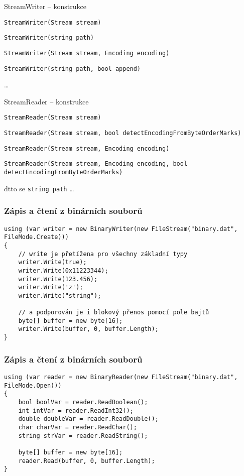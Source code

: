 \begin{frame}[fragile]
\vfill
\begin{bitemize}{StreamWriter -- konstrukce}
\item \lstinline|StreamWriter(Stream stream)|
\item \lstinline|StreamWriter(string path)|
\item \lstinline|StreamWriter(Stream stream, Encoding encoding)|
\item \lstinline|StreamWriter(string path, bool append)|
\item \ldots
\end{bitemize}
\vfill
\begin{bitemize}{StreamReader -- konstrukce}
\item \lstinline|StreamReader(Stream stream)|
\item \lstinline|StreamReader(Stream stream, bool detectEncodingFromByteOrderMarks)|
\item \lstinline|StreamReader(Stream stream, Encoding encoding)|
\item \lstinline|StreamReader(Stream stream, Encoding encoding, bool detectEncodingFromByteOrderMarks)|
\item dtto se \lstinline|string path| \ldots
\end{bitemize}
\vfill
\end{frame}




\begin{frame}[fragile]
\frametitle{Zápis a čtení z binárních souborů}
\begin{yesblock}
\begin{lstlisting}
using (var writer = new BinaryWriter(new FileStream("binary.dat", FileMode.Create)))
{
    // write je přetížena pro všechny základní typy
    writer.Write(true);
    writer.Write(0x11223344);
    writer.Write(123.456);
    writer.Write('z');
    writer.Write("string");

    // a podporován je i blokový přenos pomocí pole bajtů
    byte[] buffer = new byte[16];
    writer.Write(buffer, 0, buffer.Length);
}
\end{lstlisting}
\end{yesblock}
\end{frame}


\begin{frame}[fragile]
\frametitle{Zápis a čtení z binárních souborů}
\begin{yesblock}
\begin{lstlisting}
using (var reader = new BinaryReader(new FileStream("binary.dat", FileMode.Open)))
{
    bool boolVar = reader.ReadBoolean();
    int intVar = reader.ReadInt32();
    double doubleVar = reader.ReadDouble();
    char charVar = reader.ReadChar();
    string strVar = reader.ReadString();

    byte[] buffer = new byte[16];
    reader.Read(buffer, 0, buffer.Length);
}
\end{lstlisting}
\end{yesblock}
\end{frame}